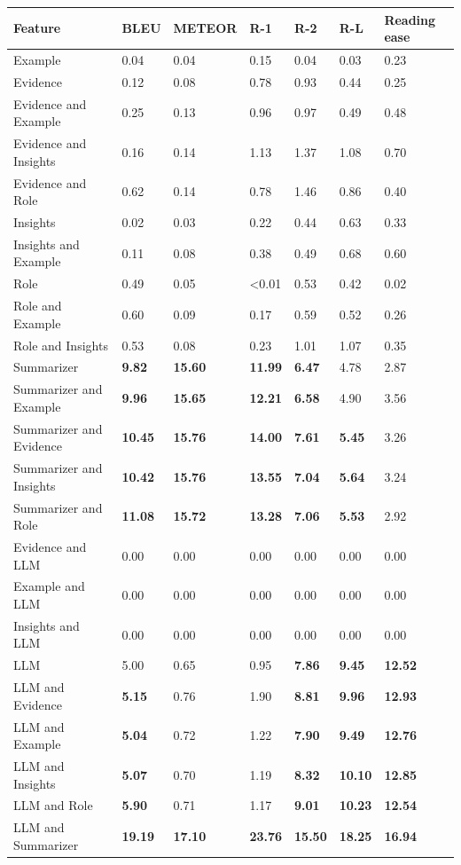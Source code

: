 \begin{tabular}{|l|l|l|l|l|l|l|}
\hline
\textbf{Feature} & BLEU & METEOR & R-1 & R-2 & R-L & Reading ease \\
 \hline
 Example & 0.04 & 0.04 & 0.15 & 0.04 & 0.03 & 0.23 \\
 \hline
 Evidence & 0.12 & 0.08 & 0.78 & 0.93 & 0.44 & 0.25 \\
 \hline
 Evidence and Example & 0.25 & 0.13 & 0.96 & 0.97 & 0.49 & 0.48 \\
 \hline
 Evidence and Insights & 0.16 & 0.14 & 1.13 & 1.37 & 1.08 & 0.70 \\
 \hline
 Evidence and Role & 0.62 & 0.14 & 0.78 & 1.46 & 0.86 & 0.40 \\
 \hline
 Insights & 0.02 & 0.03 & 0.22 & 0.44 & 0.63 & 0.33 \\
 \hline
 Insights and Example & 0.11 & 0.08 & 0.38 & 0.49 & 0.68 & 0.60 \\
 \hline
 Role & 0.49 & 0.05 & \textless{}0.01 & 0.53 & 0.42 & 0.02 \\
 \hline
 Role and Example & 0.60 & 0.09 & 0.17 & 0.59 & 0.52 & 0.26 \\
 \hline
 Role and Insights & 0.53 & 0.08 & 0.23 & 1.01 & 1.07 & 0.35 \\
 \hline
 Summarizer & \textbf{9.82} & \textbf{15.60} & \textbf{11.99} & \textbf{6.47} & 4.78 & 2.87 \\
 \hline
 Summarizer and Example & \textbf{9.96} & \textbf{15.65} & \textbf{12.21} & \textbf{6.58} & 4.90 & 3.56 \\
 \hline
 Summarizer and Evidence & \textbf{10.45} & \textbf{15.76} & \textbf{14.00} & \textbf{7.61} & \textbf{5.45} & 3.26 \\
 \hline
 Summarizer and Insights & \textbf{10.42} & \textbf{15.76} & \textbf{13.55} & \textbf{7.04} & \textbf{5.64} & 3.24 \\
 \hline
 Summarizer and Role & \textbf{11.08} & \textbf{15.72} & \textbf{13.28} & \textbf{7.06} & \textbf{5.53} & 2.92 \\
 \hline
 Evidence and LLM & 0.00 & 0.00 & 0.00 & 0.00 & 0.00 & 0.00 \\
 \hline
 Example and LLM & 0.00 & 0.00 & 0.00 & 0.00 & 0.00 & 0.00 \\
 \hline
 Insights and LLM & 0.00 & 0.00 & 0.00 & 0.00 & 0.00 & 0.00 \\
 \hline
 LLM & 5.00 & 0.65 & 0.95 & \textbf{7.86} & \textbf{9.45} & \textbf{12.52} \\
 \hline
 LLM and Evidence & \textbf{5.15} & 0.76 & 1.90 & \textbf{8.81} & \textbf{9.96} & \textbf{12.93} \\
 \hline
 LLM and Example & \textbf{5.04} & 0.72 & 1.22 & \textbf{7.90} & \textbf{9.49} & \textbf{12.76} \\
 \hline
 LLM and Insights & \textbf{5.07} & 0.70 & 1.19 & \textbf{8.32} & \textbf{10.10} & \textbf{12.85} \\
 \hline
 LLM and Role & \textbf{5.90} & 0.71 & 1.17 & \textbf{9.01} & \textbf{10.23} & \textbf{12.54} \\
 \hline
 LLM and Summarizer & \textbf{19.19} & \textbf{17.10} & \textbf{23.76} & \textbf{15.50} & \textbf{18.25} & \textbf{16.94} \\
\hline
\end{tabular}

